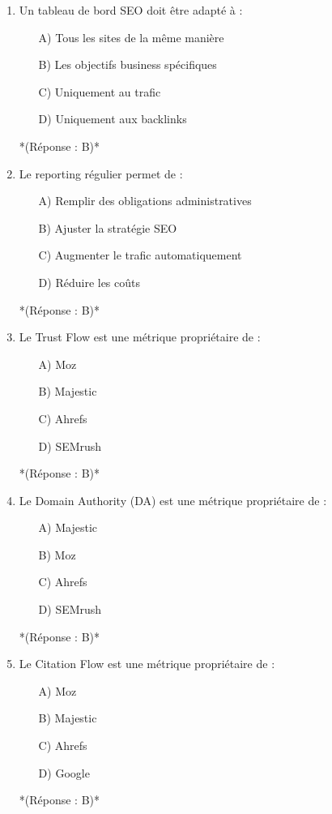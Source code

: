 \documentclass[12pt,a4paper,twoside]{report}
\begin{document}
\begin{enumerate}
    \item Un tableau de bord SEO doit être adapté à :
    \begin{itemize}
        \item[A)] Tous les sites de la même manière
        \item[B)] Les objectifs business spécifiques
        \item[C)] Uniquement au trafic
        \item[D)] Uniquement aux backlinks
    \end{itemize}
    *(Réponse : B)*

    \item Le reporting régulier permet de :
    \begin{itemize}
        \item[A)] Remplir des obligations administratives
        \item[B)] Ajuster la stratégie SEO
        \item[C)] Augmenter le trafic automatiquement
        \item[D)] Réduire les coûts
    \end{itemize}
    *(Réponse : B)*

    \item Le Trust Flow est une métrique propriétaire de :
    \begin{itemize}
        \item[A)] Moz
        \item[B)] Majestic
        \item[C)] Ahrefs
        \item[D)] SEMrush
    \end{itemize}
    *(Réponse : B)*

    \item Le Domain Authority (DA) est une métrique propriétaire de :
    \begin{itemize}
        \item[A)] Majestic
        \item[B)] Moz
        \item[C)] Ahrefs
        \item[D)] SEMrush
    \end{itemize}
    *(Réponse : B)*

    \item Le Citation Flow est une métrique propriétaire de :
    \begin{itemize}
        \item[A)] Moz
        \item[B)] Majestic
        \item[C)] Ahrefs
        \item[D)] Google
    \end{itemize}
    *(Réponse : B)*


\end{enumerate}
\end{document}
